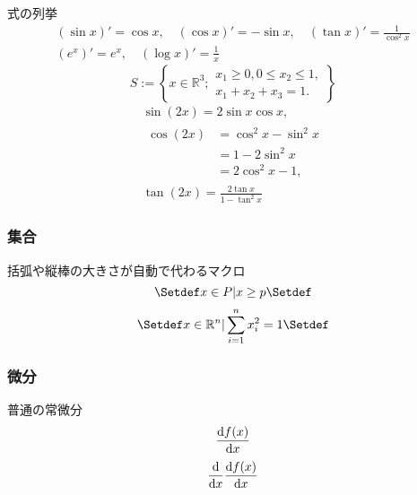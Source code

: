 \documentclass[uplatex, 11pt, a4j, dvipdfmx]{jsarticle}
\begin{document}
      式の列挙
      \begin{equation}\begin{gathered}
        (\sin x)' = \cos x, \quad (\cos x)' = -\sin x, \quad (\tan x)' = \frac{1}{\cos^2 x} \\
        (e^x)' = e^x, \quad (\log x)' = \frac{1}{x}
      \end{gathered}\end{equation}
      \begin{equation}
        S := \left\{ x \in \mathbb{R}^3 ;
        \begin{gathered}
          x_1 \ge 0, 0 \le x_2 \le 1, \\
          x_1 + x_2 + x_3 = 1. 
        \end{gathered} \right\}
      \end{equation}
      \begin{gather}
        \sin(2x) = 2 \sin x \cos x, \\ 
        \begin{split}
            \cos(2x) &= \cos^2 x - \sin^2 x \\
                     &= 1 - 2 \sin^2 x \\
                     &= 2 \cos^2 x - 1,
        \end{split} \\
        \tan(2x) = \frac{2 \tan x}{1 - \tan^2 x}
      \end{gather}

    \subsubsection{集合}
      括弧や縦棒の大きさが自動で代わるマクロ
      \begin{equation}
        \Set{ x \in P | x \geq p }
      \end{equation}
      \begin{equation}
        \Set{ x\in \R^n | \sum_{i=1}^n x_i^2 = 1 }
      \end{equation}

    \subsubsection{微分}
      普通の常微分
      \begin{equation}
        \diff{f(x)}{x} \label{eq:test2}
      \end{equation}
      \begin{equation}
        \diff*{\diff{f(x)}{x}}{x} \label{eq:test2'}
      \end{equation}
\end{document}
